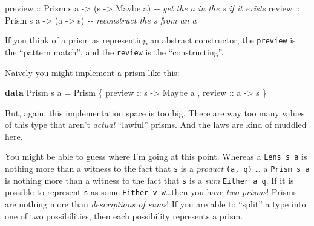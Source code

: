 \documentclass[]{article}
\newenvironment{Shaded}{}{}
\newcommand{\CommentTok}[1]{\textcolor[rgb]{0.38,0.63,0.69}{\textit{#1}}}
\newcommand{\DataTypeTok}[1]{\textcolor[rgb]{0.56,0.13,0.00}{#1}}
\newcommand{\KeywordTok}[1]{\textcolor[rgb]{0.00,0.44,0.13}{\textbf{#1}}}
\newcommand{\NormalTok}[1]{#1}
\newcommand{\OtherTok}[1]{\textcolor[rgb]{0.00,0.44,0.13}{#1}}
\begin{document}
\begin{Shaded}
\begin{Highlighting}[]
\OtherTok{preview ::} \DataTypeTok{Prism\textquotesingle{}}\NormalTok{ s a }\OtherTok{{-}>}\NormalTok{ (s }\OtherTok{{-}>} \DataTypeTok{Maybe}\NormalTok{ a)   }\CommentTok{{-}{-} get the \textquotesingle{}a\textquotesingle{} in the \textquotesingle{}s\textquotesingle{} if it exists}
\OtherTok{review  ::} \DataTypeTok{Prism\textquotesingle{}}\NormalTok{ s a }\OtherTok{{-}>}\NormalTok{ (a }\OtherTok{{-}>}\NormalTok{ s)         }\CommentTok{{-}{-} reconstruct the \textquotesingle{}s\textquotesingle{} from an \textquotesingle{}a\textquotesingle{}}
\end{Highlighting}
\end{Shaded}

If you think of a prism as representing an abstract constructor, the
\texttt{preview} is the ``pattern match'', and the \texttt{review} is the
``constructing''.

Naively you might implement a prism like this:

\begin{Shaded}
\begin{Highlighting}[]
\KeywordTok{data} \DataTypeTok{Prism\textquotesingle{}}\NormalTok{ s a }\OtherTok{=} \DataTypeTok{Prism\textquotesingle{}}
\NormalTok{    \{}\OtherTok{ preview ::}\NormalTok{ s }\OtherTok{{-}>} \DataTypeTok{Maybe}\NormalTok{ a}
\NormalTok{    ,}\OtherTok{ review  ::}\NormalTok{ a }\OtherTok{{-}>}\NormalTok{ s}
\NormalTok{    \}}
\end{Highlighting}
\end{Shaded}

But, again, this implementation space is too big. There are way too many values
of this type that aren't \emph{actual} ``lawful'' prisms. And the laws are kind
of muddled here.

You might be able to guess where I'm going at this point. Whereas a
\texttt{Lens\textquotesingle{}\ s\ a} is nothing more than a witness to the fact
that \texttt{s} is a \emph{product} \texttt{(a,\ q)} \ldots{} a
\texttt{Prism\textquotesingle{}\ s\ a} is nothing more than a witness to the
fact that \texttt{s} is a \emph{sum} \texttt{Either\ a\ q}. If it is possible to
represent \texttt{s} as some \texttt{Either\ v\ w}\ldots then you have \emph{two
prisms}! Prisms are nothing more than \emph{descriptions of sums}! If you are
able to ``split'' a type into one of two possibilities, then each possibility
represents a prism.
\end{document}
